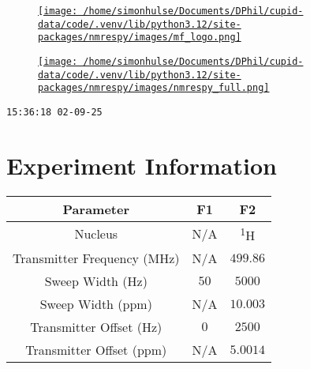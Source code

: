 \documentclass[8pt]{article}
\begin{document}
\begin{figure}[!ht]
\begin{minipage}[b][2.5cm][c]{.72\textwidth}
\href{http://foroozandeh.chem.ox.ac.uk/home}%
{\texttt{[image: /home/simonhulse/Documents/DPhil/cupid-data/code/.venv/lib/python3.12/site-packages/nmrespy/images/mf\_logo.png]}}
\end{minipage}
\begin{minipage}[b][2.5cm][c]{.27\textwidth}
\href{https://foroozandehgroup.github.io/NMR-EsPy}%
{\texttt{[image: /home/simonhulse/Documents/DPhil/cupid-data/code/.venv/lib/python3.12/site-packages/nmrespy/images/nmrespy\_full.png]}}
\end{minipage}
\end{figure}
\texttt{15:36:18 02-09-25}



\section*{Experiment Information}
\begin{longtable}[l]{c c c}
\toprule
Parameter & F1 & F2\\
\midrule
Nucleus & N/A & \textsuperscript{1}H\\
Transmitter Frequency (MHz) & N/A & $\num{499.86}$\\
Sweep Width (Hz) & $\num{50}$ & $\num{5000}$\\
Sweep Width (ppm) & N/A & $\num{10.003}$\\
Transmitter Offset (Hz) & $\num{0}$ & $\num{2500}$\\
Transmitter Offset (ppm) & N/A & $\num{5.0014}$\\
\bottomrule
\end{longtable}
\end{document}
